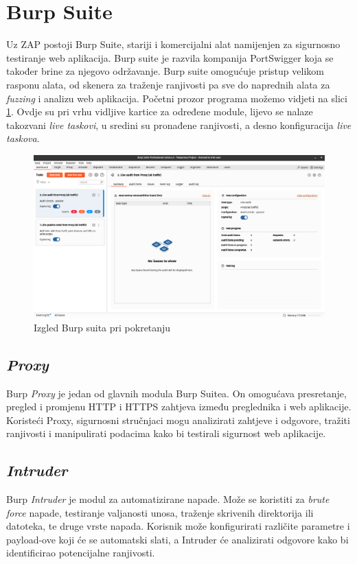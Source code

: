 \section{Burp Suite}
Uz ZAP postoji Burp Suite, stariji i komercijalni alat namijenjen za sigurnosno testiranje 
web aplikacija. Burp suite je razvila kompanija PortSwigger koja se također brine za njegovo 
održavanje. Burp suite omogućuje pristup velikom rasponu alata, od skenera za traženje ranjivosti 
pa sve do naprednih alata za \textit{fuzzing} i analizu web aplikacija. Početni prozor programa možemo vidjeti na slici \ref{slk:burp_start}.
Ovdje su pri vrhu vidljive kartice za određene module, lijevo se nalaze takozvani \textit{live taskovi}, u sredini su pronađene ranjivosti, a desno konfiguracija \textit{live taskova}.
\begin{figure}[H]
    \centering
    \includegraphics[width=1\textwidth]{slike/burp_start.png}
    \caption{Izgled Burp suita pri pokretanju}
    \label{slk:burp_start}
\end{figure}
\subsection{\textit{Proxy}}
Burp \textit{Proxy} je jedan od glavnih modula Burp Suitea. On omogućava presretanje, pregled i promjenu HTTP i HTTPS zahtjeva između preglednika i web aplikacije. 
Koristeći Proxy, sigurnosni stručnjaci mogu analizirati zahtjeve i odgovore, tražiti ranjivosti i manipulirati podacima kako bi testirali sigurnost web aplikacije.\cite{burp_feat}

\subsection{\textit{Intruder}}
Burp \textit{Intruder} je modul za automatizirane napade. Može se koristiti za \textit{brute force} napade, testiranje valjanosti unosa, traženje skrivenih direktorija ili datoteka, 
te druge vrste napada. Korisnik može konfigurirati različite parametre i payload-ove koji će se automatski slati, a Intruder će analizirati odgovore kako bi identificirao 
potencijalne ranjivosti.\cite{burp_feat}

